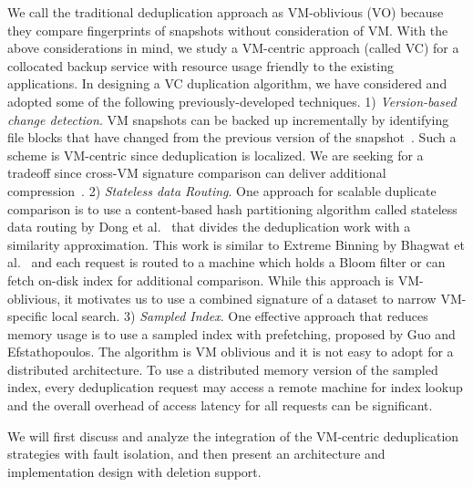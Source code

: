 We call the traditional deduplication approach as   VM-oblivious (VO)
because they compare fingerprints of snapshots without consideration of VM.
With the above  considerations in mind, we study a 
VM-centric approach (called VC)
for a collocated backup service with resource usage friendly
to the existing applications.  
In designing a VC duplication algorithm, we have considered and adopted some of
the following previously-developed techniques.
1)
{\em Version-based change detection}.
VM snapshots can be  backed up  incrementally by identifying file  blocks that have
changed from the previous version of the snapshot~\cite{Clements2009,Vrable2009,TanIPDPS2011}.
Such a scheme  is  VM-centric since deduplication is localized. 
We are seeking for a tradeoff since 
cross-VM  signature comparison can deliver additional compression~\cite{Guo2011,Dong2011,extreme_binning09}.
2) {\em Stateless  data Routing}.
One approach for scalable duplicate comparison is to use a content-based hash
partitioning algorithm called stateless data routing by Dong et al.~\cite{Dong2011} 
that divides the deduplication work with a similarity approximation. This work 
is similar to Extreme Binning by Bhagwat et al.~\cite{extreme_binning09} and 
each request is routed  to a machine which holds
a Bloom filter  or can fetch on-disk index for additional comparison.
While this approach is VM-oblivious, it motivates us to  use  a combined signature of a dataset to narrow
VM-specific local search.
3) {\em Sampled Index}.
One effective approach that reduces memory usage is 
to use a sampled index with prefetching, proposed  by Guo and Efstathopoulos\cite{Guo2011}. 
The algorithm is VM oblivious and it is not easy  to adopt for a distributed architecture. 
To use a distributed memory version of the sampled index, every deduplication request
may access a remote machine for index lookup and the overall overhead of access latency for all requests
can be significant.  


We will first discuss and analyze the integration of the VM-centric deduplication strategies with fault isolation, 
and then present
an architecture and implementation design with deletion support.
